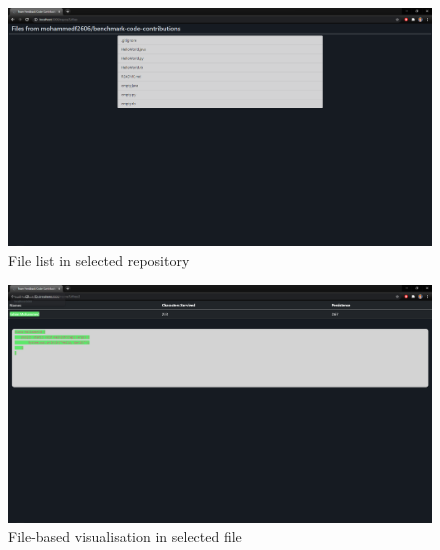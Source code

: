 \begin{figure}
    \centering
    \includegraphics[scale=0.3]{Appendices/Screenshot_96.png}
    \caption{File list in selected repository}
    \label{fig:sc5}
\end{figure}
\begin{figure}
    \centering
    \includegraphics[scale=0.3]{Appendices/Screenshot_97.png}
    \caption{File-based visualisation in selected file}
    \label{fig:sc6}
\end{figure}
